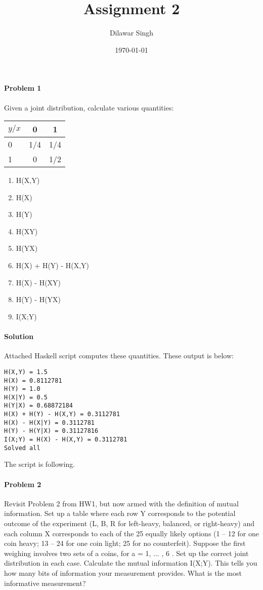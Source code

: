 \documentclass[]{article}
\title{Assignment 2}
\author{Dilawar Singh}
\date{\today}
\begin{document}
\maketitle

\paragraph{Problem 1}

Given a joint distribution, calculate various quantities:

\begin{tabular}[c]{l|c c}
\(y/x\) & 0 & 1 \\
\hline
0 & 1/4 & 1/4 \\
1 & 0 & 1/2 \\
\hline
\end{tabular}

\begin{enumerate}
\item H(X,Y)
\item H(X)
\item H(Y)
\item H(X\textbar{}Y)
\item H(Y\textbar{}X)
\item H(X) + H(Y) - H(X,Y)
\item H(X) - H(X\textbar{}Y)
\item H(Y) - H(Y\textbar{}X)
\item I(X;Y)
\end{enumerate}

\paragraph*{Solution}

Attached Haskell script computes these quantities. These output is below:

\begin{lstlisting}
H(X,Y) = 1.5 
H(X) = 0.8112781
H(Y) = 1.0
H(X|Y) = 0.5
H(Y|X) = 0.68872184
H(X) + H(Y) - H(X,Y) = 0.3112781
H(X) - H(X|Y) = 0.3112781
H(Y) - H(Y|X) = 0.31127816
I(X;Y) = H(X) - H(X,Y) = 0.3112781
Solved all
\end{lstlisting}

The script is following.


\paragraph{Problem 2}

Revisit Problem 2 from HW1, but now armed with the definition of mutual
information. Set up a table where each row Y corresponds to the potential
outcome of the experiment (L, B, R for left-heavy, balanced, or right-heavy) and
each column X corresponds to each of the 25 equally likely options (1 – 12 for
one coin heavy; 13 – 24 for one coin light; 25 for no counterfeit).  Suppose the
first weighing involves two sets of a coins, for a = 1, ... , 6 . Set up the
correct joint distribution in each case. Calculate the mutual information
I(X;Y). This tells you how many bits of information your measurement provides.
What is the most informative measurement?
\end{document}
